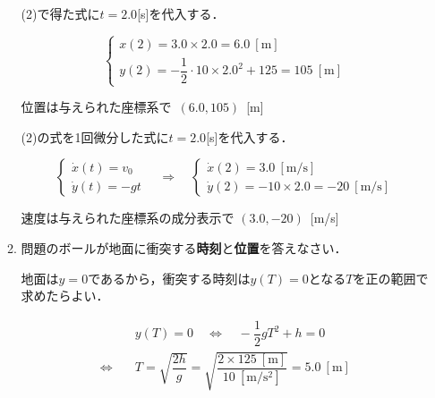\documentclass[a4paper,11pt]{ltjsarticle}
\begin{document}
\begin{enumerate}
\begin{enumerate}[label=(\arabic*)]
        \vspace{5pt}

        (2)で得た式に$t=2.0$[s]を代入する．

        \begin{equation*}
            \begin{cases}
                x(2)=3.0 \times 2.0=6.0\ [\mathrm{m}] \\
                y(2)=-\dfrac{1}{2} \cdot 10 \times 2.0^2+125=105\ [\mathrm{m}]
            \end{cases}
        \end{equation*}

        位置は与えられた座標系で\ $(6.0,105)$\ [m]

        \vspace{5pt}

        (2)の式を1回微分した式に$t=2.0$[s]を代入する．

        \begin{equation*}
            \begin{cases}
                \dot{x}(t)=v_0 \\
                \dot{y}(t)=-gt
            \end{cases}
            \quad \Rightarrow \quad
            \begin{cases}
                \dot{x}(2)=3.0\ [\mathrm{m/s}] \\
                \dot{y}(2)=-10 \times 2.0 = -20\ [\mathrm{m/s}]
            \end{cases}
        \end{equation*}

        速度は与えられた座標系の成分表示で $(3.0,-20)$\ [m/s]

        \vspace{5pt}

        \item 問題のボールが地面に衝突する\textbf{時刻}と\textbf{位置}を答えなさい．
        
        \vspace{5pt}

        地面は$y=0$であるから，衝突する時刻は$y(T)=0$となる$T$を正の範囲で求めたらよい．

        \begin{equation*}
            \begin{aligned}
                & y(T)=0 \quad \Leftrightarrow \quad -\dfrac{1}{2}gT^2+h=0 \\[5pt]
                \Leftrightarrow \quad & T=\sqrt{\dfrac{2h}{g}} = \sqrt{\dfrac{2 \times 125\ [\mathrm{m}]}{10\ [\mathrm{m/s^2}]}}=5.0\ [\mathrm{m}]
            \end{aligned}
        \end{equation*}


\end{enumerate}
\end{enumerate}
\end{document}
